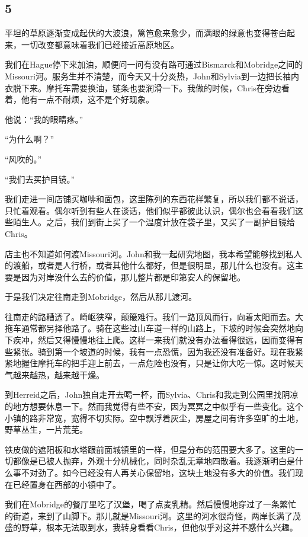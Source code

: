\documentclass[UTF8]{article}
\begin{document}
\subsection*{5}
\par 平坦的草原逐渐变成起伏的大波浪，篱笆愈来愈少，而满眼的绿意也变得苍白起来，一切改变都意味着我们已经接近高原地区。
\par 我们在Hague停下来加油，顺便问一问有没有路可通过Bismarck和Mobridge之间的Missouri河。服务生并不清楚，而今天又十分炎热，John和Sylvia到一边把长袖内衣脱下来。摩托车需要换油，链条也要润滑一下。我做的时候，Chris在旁边看着，他有一点不耐烦，这不是个好现象。
\par 他说：“我的眼睛疼。”
\par “为什么啊？”
\par “风吹的。”
\par “我们去买护目镜。”
\par 我们走进一间店铺买咖啡和面包，这里陈列的东西花样繁复，所以我们都不说话，只忙着观看。偶尔听到有些人在谈话，他们似乎都彼此认识，偶尔也会看看我们这些陌生人。之后，我们到街上买了一个温度计放在袋子里，又买了一副护目镜给Chris。
\par 店主也不知道如何渡Missouri河。John和我一起研究地图，我本希望能够找到私人的渡船，或者是人行桥，或者其他什么都好，但是很明显，那儿什么也没有。这主要是因为对岸没什么去的价值，那儿整片都是印第安人的保留地。
\par 于是我们决定往南走到Mobridge，然后从那儿渡河。
\par 往南走的路糟透了。崎岖狭窄，颠簸难行。我们一路顶风而行，向着太阳而去。大拖车通常都另择他路了。骑在这些过山车道一样的山路上，下坡的时候会突然地向下疾冲，然后又得慢慢地往上爬。这样一来我们就没有办法看得很远，因而变得有些紧张。骑到第一个坡道的时候，我有一点恐慌，因为我还没有准备好。现在我紧紧地握住摩托车的把手迎上前去，一点危险也没有，只是让你大吃一惊。这时候天气越来越热，越来越干燥。
\par 到Herreid之后，John独自走开去喝一杯，而Sylvia、Chris和我走到公园里找阴凉的地方想要休息一下。然而我觉得有些不安，因为冥冥之中似乎有一些变化。这个小镇的路非常宽，宽得不切实际。空中飘浮着灰尘，房屋之间有许多空旷的土地，野草丛生，一片荒芜。
\par 铁皮做的遮阳板和水塔跟前面城镇里的一样，但是分布的范围要大多了。这里的一切都像是已被人抛弃，外观十分机械化，同时杂乱无章地四散着。我逐渐明白是什么事不对劲了。如今已经没有人再关心保留地，这块土地没有多大的价值。我们现在已经置身在西部的小镇中了。
\par 我们在Mobridge的餐厅里吃了汉堡，喝了点麦乳精。然后慢慢地穿过了一条繁忙的街道，来到了山脚下。那儿就是Missouri河。这里的河水很奇怪，两岸长满了茂盛的野草，根本无法取到水，我转身看看Chris，但他似乎对这并不感什么兴趣。
\end{document}
